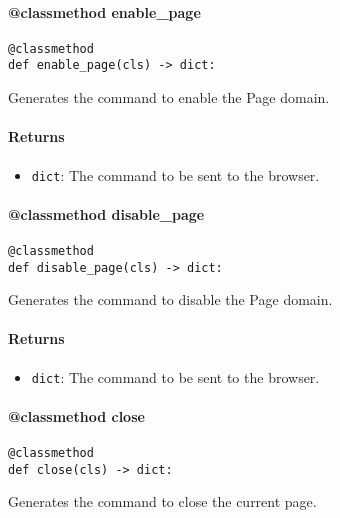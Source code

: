 \documentclass{article}
\begin{document}
\paragraph{@classmethod enable\_page}

\begin{lstlisting}[style=pythonstyle]
@classmethod
def enable_page(cls) -> dict:
\end{lstlisting}

\noindent Generates the command to enable the Page domain.

\paragraph{Returns}

\begin{itemize}
    \item \lstinline[style=pythonstyle]|dict|: The command to be sent to the browser.
\end{itemize}

\paragraph{@classmethod disable\_page}

\begin{lstlisting}[style=pythonstyle]
@classmethod
def disable_page(cls) -> dict:
\end{lstlisting}

\noindent Generates the command to disable the Page domain.

\paragraph{Returns}

\begin{itemize}
    \item \lstinline[style=pythonstyle]|dict|: The command to be sent to the browser.
\end{itemize}

\paragraph{@classmethod close}

\begin{lstlisting}[style=pythonstyle]
@classmethod
def close(cls) -> dict:
\end{lstlisting}

\noindent Generates the command to close the current page.
\end{document}
